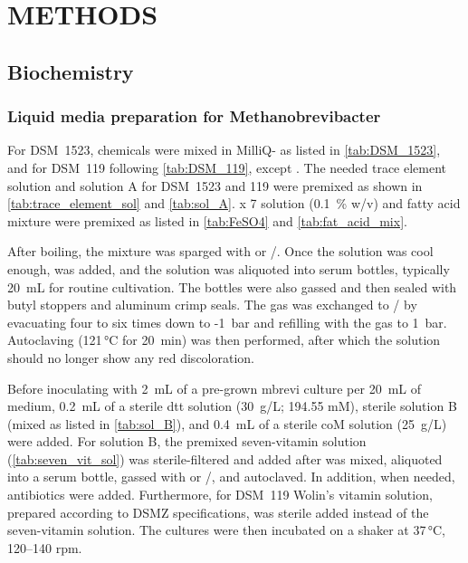 


\section{METHODS}
\label{sec:methods}


\subsection{Biochemistry}

\subsubsection{Liquid media preparation for \textup{Methanobrevibacter}}
\label{sec:liquid_media_preparation}

For DSM~1523, chemicals were mixed in MilliQ- as listed in \cref{tab:DSM_1523}, and for DSM~119 following \cref{tab:DSM_119}, except . The needed trace element solution and solution A for DSM~1523 and 119 were premixed as shown in \cref{tab:trace_element_sol} and \cref{tab:sol_A}.  x 7  solution (0.1~\% w/v) and fatty acid mixture were premixed as listed in \cref{tab:FeSO4} and \cref{tab:fat_acid_mix}.




\newpage

After boiling, the mixture was sparged with  or /. Once the solution was cool enough,  was added, and the solution was aliquoted into serum bottles, typically 20~mL for routine cultivation. The bottles were also gassed and then sealed with butyl stoppers and aluminum crimp seals. The gas was exchanged to / by evacuating four to six times down to -1~bar and refilling with the gas to 1~bar. Autoclaving (121\,°C for 20~min) was then performed, after which the solution should no longer show any red discoloration.

Before inoculating with 2~mL of a pre-grown \acrlong{mbrevi} culture per 20~mL of medium, 0.2~mL of a sterile \acrshort{dtt} solution (30~g/L; 194.55 mM), sterile solution B (mixed as listed in \cref{tab:sol_B}), and 0.4~mL of a sterile \acrshort{coM} solution (25~g/L) were added. For solution B, the premixed seven-vitamin solution (\cref{tab:seven_vit_sol}) was sterile-filtered and added after  was mixed, aliquoted into a serum bottle, gassed with  or /, and autoclaved. In addition, when needed, antibiotics were added. Furthermore, for DSM~119 Wolin's vitamin solution, prepared according to DSMZ specifications, was sterile added instead of the seven-vitamin solution.
The cultures were then incubated on a shaker at 37\,°C, 120–140 rpm.

